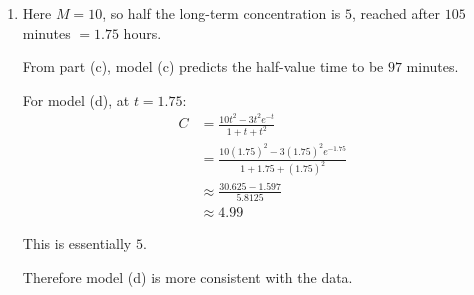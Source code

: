 \documentclass[leqno]{article}
\begin{document}
\begin{enumerate}[
  label=\textbf{\arabic*.},
  leftmargin=*,
  topsep=0pt,
  partopsep=0pt,
  parsep=0pt
]
\begin{djsSolution}
\begin{enumerate}[label=\textbf{(\alph*)}]
  Hence
  \begin{align*}
  C
  &= \frac{-3e^{-t}+K}{\mu} \\
  &= \frac{t^2(-3e^{-t}+K)}{1+t+t^2} \\
  &= \frac{Kt^2-3t^2e^{-t}}{1+t+t^2}
  \end{align*}

  Now use the long-term value. As $t\to\infty$:
  \[
  \frac{Kt^2}{1+t+t^2}\to K
  \]

  and, using the fact that $\lim_{t\to\infty} t^2e^{-t}=0$:
  \[
  \frac{3t^2e^{-t}}{1+t+t^2}\to 0
  \]

  Therefore
  \[
  \lim_{t\to\infty} C=K
  \]

  Since the long-term concentration is $M$, $K=M$.

  So
  \[
  C=\frac{Mt^2-3t^2e^{-t}}{1+t+t^2}
  \]

  as required.

  \item Here $M=10$, so half the long-term concentration is $5$, reached after $105$ minutes $=1.75$ hours.

  From part (c), model (c) predicts the half-value time to be $97$ minutes.

  For model (d), at $t=1.75$:
  \begin{align*}
  C
  &= \frac{10t^2-3t^2e^{-t}}{1+t+t^2} \\
  &= \frac{10(1.75)^2-3(1.75)^2e^{-1.75}}{1+1.75+(1.75)^2} \\
  &\approx \frac{30.625-1.597}{5.8125} \\
  &\approx 4.99
  \end{align*}

  This is essentially $5$.

  Therefore model (d) is more consistent with the data.
\end{enumerate}
\end{djsSolution}

\end{enumerate}
\end{document}
